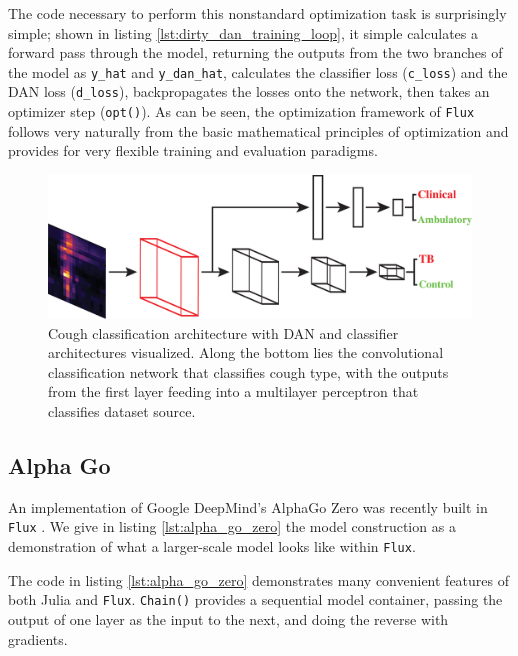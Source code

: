 \documentclass{juliacon}
\begin{document}
The code necessary to perform this nonstandard optimization task is surprisingly simple; shown in listing \ref{lst:dirty_dan_training_loop}, it simple calculates a forward pass through the model, returning the outputs from the two branches of the model as \texttt{y\_hat} and \texttt{y\_dan\_hat}, calculates the classifier loss (\texttt{c\_loss}) and the DAN loss (\texttt{d\_loss}), backpropagates the losses onto the network, then takes an optimizer step (\texttt{opt()}).  As can be seen, the optimization framework of \texttt{Flux} follows very naturally from the basic mathematical principles of optimization and provides for very flexible training and evaluation paradigms.

\begin{figure}[ht]
  \centering
  \includegraphics[width=.95\linewidth]{figures/DANArch_red.eps}
  \caption{Cough classification architecture with DAN and classifier architectures visualized.  Along the bottom lies the convolutional classification network that classifies cough type, with the outputs from the first layer feeding into a multilayer perceptron that classifies dataset source.}
  \label{fig:dirty_dan}
\end{figure}

\subsection{Alpha Go}

An implementation of Google DeepMind's AlphaGo Zero \cite{AlphaGoZero} was recently built in \texttt{Flux} \cite{AlphaGo.jl}. We give in listing \ref{lst:alpha_go_zero} the model construction as a demonstration of what a larger-scale model looks like within \texttt{Flux}.

The code in listing \ref{lst:alpha_go_zero} demonstrates many convenient features of both Julia and \texttt{Flux}. \texttt{Chain()} provides a sequential model container, passing the output of one layer as the input to the next, and doing the reverse with gradients.
\end{document}
